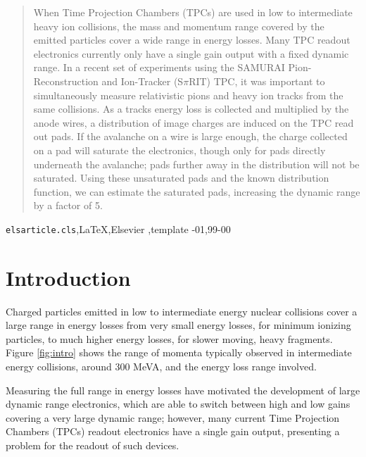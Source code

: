\documentclass[review]{elsarticle}
\begin{document}
\begin{frontmatter}
\begin{abstract}
When Time Projection Chambers (TPCs) are used in low to intermediate heavy ion collisions, the mass and momentum range covered by the emitted particles cover a wide range in energy losses. Many TPC readout electronics currently only have a single gain output with a fixed dynamic range. In a recent set of experiments using the SAMURAI Pion-Reconstruction and Ion-Tracker (S$\pi$RIT) TPC, it was important to simultaneously measure relativistic pions and heavy ion tracks from the same collisions. As a tracks energy loss is collected and multiplied by the anode wires, a distribution of image charges are induced on the TPC read out pads. If the avalanche on a wire is large enough, the charge collected on a pad will saturate the electronics, though only for pads directly underneath the avalanche; pads further away in the distribution will not be saturated. Using these unsaturated pads and the known distribution function, we can estimate the saturated pads, increasing the dynamic range by a factor of 5.

\end{abstract}

\begin{keyword}
\texttt{elsarticle.cls}\sep \LaTeX\sep Elsevier \sep template
-01\sep  99-00
\end{keyword}

\end{frontmatter}

\linenumbers

\section{Introduction} 
 Charged particles emitted in low to intermediate energy nuclear collisions cover a large range in energy losses from very small energy losses, for minimum ionizing particles, to much higher energy losses, for slower moving, heavy fragments. Figure \ref{fig:intro} shows the range of momenta typically observed in intermediate energy collisions, around 300 MeVA, and the energy loss range involved.  
 
  Measuring the full range in energy losses have motivated the development of large dynamic range electronics, which are able to switch between high and low gains covering a very large dynamic range; however, many current Time Projection Chambers (TPCs) readout electronics have a single gain output, presenting a problem for the readout of such devices.
 
\end{document}
